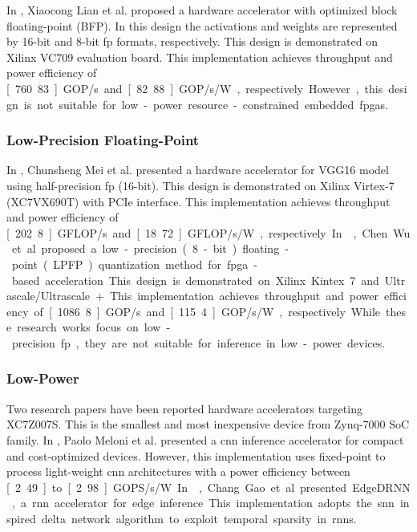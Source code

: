 In \cite{lian2019high}, Xiaocong Lian et al. proposed a hardware accelerator with optimized block floating-point (BFP). In this design the activations and weights are represented by 16-bit and 8-bit \gls{fp} formats, respectively. This design is demonstrated on Xilinx VC709 evaluation board. This implementation achieves throughput and power efficiency of \unit[760.83]{GOP/s} and \unit[82.88]{GOP/s/W}, respectively. However, this design is not suitable for low-power resource-constrained embedded \glspl{fpga}.

\subsubsection{Low-Precision Floating-Point}
In \cite{mei2017200mhz}, Chunsheng Mei et al. presented a hardware accelerator for VGG16 model using half-precision \gls{fp} (16-bit). This design is demonstrated on Xilinx Virtex-7 (XC7VX690T) with PCIe interface. This implementation achieves throughput and power efficiency of \unit[202.8]{GFLOP/s} and \unit[18.72]{GFLOP/s/W}, respectively. In \cite{wu2021low}, Chen Wu et al. proposed a low-precision (8-bit) floating-point (LPFP) quantization method for \gls{fpga}-based acceleration. This design is demonstrated on Xilinx Kintex 7 and Ultrascale/Ultrascale+. This implementation achieves throughput and power efficiency of \unit[1086.8]{GOP/s} and \unit[115.4]{GOP/s/W}, respectively. While these research works focus on low-precision \gls{fp}, they are not suitable for inference in low-power devices.

\subsubsection{Low-Power}
Two research papers have been reported hardware accelerators targeting XC7Z007S. This is the smallest and most inexpensive device from Zynq-7000 SoC family. In \cite{meloni2019cnn}, Paolo Meloni et al. presented a \gls{cnn} inference accelerator for compact and cost-optimized devices. However, this implementation uses fixed-point to process light-weight \gls{cnn} architectures with a power efficiency between \unit[2.49] to \unit[2.98]{GOPS/s/W}.

In \cite{gao2020edgedrnn}, Chang Gao et al. presented EdgeDRNN, a \gls{rnn} accelerator for edge inference. This implementation adopts the \gls{snn} inspired delta network algorithm to exploit temporal sparsity in \glspl{rnn}.

